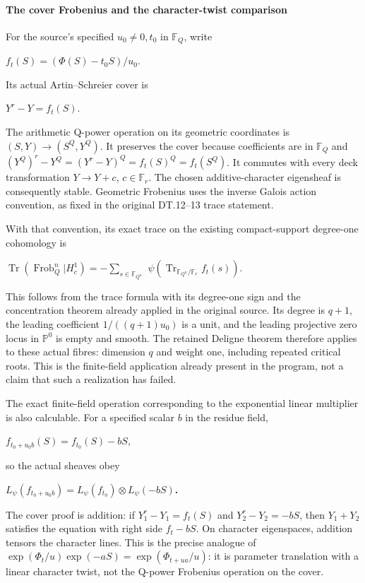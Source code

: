 \paragraph{The cover Frobenius and the character-twist comparison}\label{endpoint-f1_scaling--the-cover-frobenius-and-the-character-twist-comparison}

For the source's specified \(u_0\ne 0,t_0\) in \(\mathbb F_Q\), write

\(f_t(S)=(\Phi(S)-t_0S)/u_0\).

Its actual Artin--Schreier cover is

\(Y^r-Y=f_t(S)\).

The arithmetic Q-power operation on its geometric coordinates is \((S,Y)\to (S^Q,Y^Q)\). It preserves the cover because coefficients are in \(\mathbb F_Q\) and \((Y^Q)^r-Y^Q=(Y^r-Y)^Q=f_t(S)^Q=f_t(S^Q)\). It commutes with every deck transformation \(Y\to Y+c\), \(c\in\mathbb F_r\). The chosen additive-character eigensheaf is consequently stable. Geometric Frobenius uses the inverse Galois action convention, as fixed in the original DT.12--13 trace statement.

With that convention, its exact trace on the existing compact-support degree-one cohomology is

\(\operatorname{Tr}(\operatorname{Frob}_Q^n|H_c^1)=-\sum_{s\in\mathbb F_{Q^n}}\) \(\psi(\operatorname{Tr}_{\mathbb F_{Q^n}/\mathbb F_r}f_t(s))\).

This follows from the trace formula with its degree-one sign and the concentration theorem already applied in the original source. Its degree is \(q+1\), the leading coefficient \(1/((q+1)u_0)\) is a unit, and the leading projective zero locus in \(\mathbb P^0\) is empty and smooth. The retained Deligne theorem therefore applies to these actual fibres: dimension \(q\) and weight one, including repeated critical roots. This is the finite-field application already present in the program, not a claim that such a realization has failed.

The exact finite-field operation corresponding to the exponential linear multiplier is also calculable. For a specified scalar \(b\) in the residue field,

\(f_{t_0+u_0 b}(S)=f_{t_0}(S)-bS\),

so the actual sheaves obey

\textbf{\(L_\psi(f_{t_0+u_0b})=L_\psi(f_{t_0}) \otimes L_\psi(-bS)\).}

The cover proof is addition: if \(Y_1^r-Y_1=f_t(S)\) and \(Y_2^r-Y_2=-bS\), then \(Y_1+Y_2\) satisfies the equation with right side \(f_t-bS\). On character eigenspaces, addition tensors the character lines. This is the precise analogue of \(\exp(\Phi_t/u)\exp(-aS)=\exp(\Phi_{t+ua}/u)\): it is parameter translation with a linear character twist, not the Q-power Frobenius operation on the cover.

